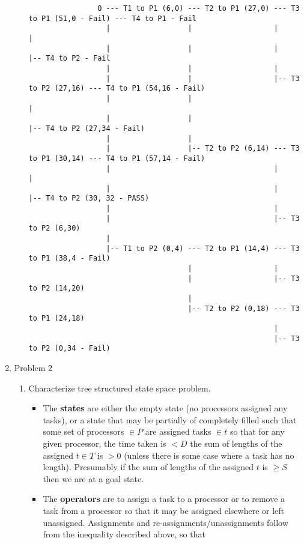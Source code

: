 \documentclass{article}
\begin{document}
\begin{enumerate}
\begin{enumerate}
				\begin{verbatim}
				O --- T1 to P1 (6,0) --- T2 to P1 (27,0) --- T3 to P1 (51,0 - Fail) --- T4 to P1 - Fail
				  |                  |                   |                          |
				  |	                 |                   |                          |-- T4 to P2 - Fail
				  |                  |                   |
				  |                  |                   |-- T3 to P2 (27,16) --- T4 to P1 (54,16 - Fail)
				  |                  |                                        |
				  |                  |                                        |-- T4 to P2 (27,34 - Fail)
				  |                  |
				  |                  |-- T2 to P2 (6,14) --- T3 to P1 (30,14) --- T4 to P1 (57,14 - Fail)
				  |                                      |                    |
				  |                                      |                    |-- T4 to P2 (30, 32 - PASS)
				  |                                      |
				  |                                      |-- T3 to P2 (6,30)
				  |
				  |-- T1 to P2 (0,4) --- T2 to P1 (14,4) --- T3 to P1 (38,4 - Fail)
				                     |                   |
				                     |                   |-- T3 to P2 (14,20)
				                     |
				                     |-- T2 to P2 (0,18) --- T3 to P1 (24,18)
				                                         |
				                                         |-- T3 to P2 (0,34 - Fail)
				\end{verbatim}
			\end{enumerate}
		
		\item Problem 2
		
		\begin{enumerate}
			\item Characterize tree structured state space problem.
			
			\begin{itemize}
				\item The \textbf{states} are either the empty state (no processors assigned any tasks), or a state that may be partially of completely filled such that some set of processors $\in P$ are assigned tasks $\in t$ so that for any given processor, the time taken is $< D$ the sum of lengths of the assigned $t \in T$ is $> 0$ (unless there is some case where a task has no length).  Presumably if the sum of lengths of the assigned $t$ is $\geq S$ then we are at a goal state.
				
				\item The \textbf{operators} are to assign a task to a processor or to remove a task from a processor so that it may be assigned elsewhere or left unassigned.  Assignments and re-assignments/unassignments follow from the inequality described above, so that 
				

\end{itemize}
\end{enumerate}
\end{enumerate}
\end{document}
